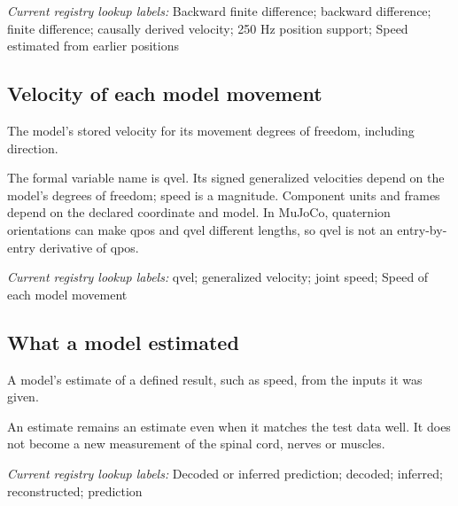 \noindent\textit{Current registry lookup labels:} Backward finite difference; backward difference; finite difference; causally derived velocity; 250 Hz position support; Speed estimated from earlier positions\par

\begin{samepage}
\subsection*{Velocity of each model movement}
\noindent The model’s stored velocity for its movement degrees of freedom, including direction.\par
\end{samepage}
\begin{samepage}
\noindent The formal variable name is qvel. Its signed generalized velocities depend on the model’s degrees of freedom; speed is a magnitude. Component units and frames depend on the declared coordinate and model. In MuJoCo, quaternion orientations can make qpos and qvel different lengths, so qvel is not an entry-by-entry derivative of qpos.\par\nopagebreak[4]

\end{samepage}


\noindent\textit{Current registry lookup labels:} qvel; generalized velocity; joint speed; Speed of each model movement\par

\begin{samepage}
\subsection*{What a model estimated}
\noindent A model’s estimate of a defined result, such as speed, from the inputs it was given.\par
\end{samepage}
\begin{samepage}
\noindent An estimate remains an estimate even when it matches the test data well. It does not become a new measurement of the spinal cord, nerves or muscles.\par\nopagebreak[4]

\end{samepage}


\noindent\textit{Current registry lookup labels:} Decoded or inferred prediction; decoded; inferred; reconstructed; prediction\par

